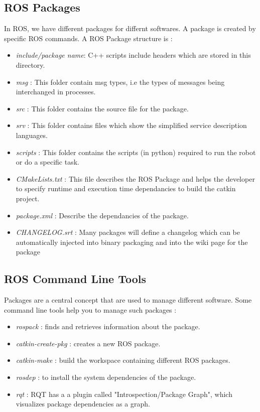 \subsection{ROS Packages}
In ROS, we have different packages for differnt softwares. A package is created by specific ROS commands. A ROS Package structure is : 
\begin{itemize}
    \item \textit{include/package name}: C++ scripts include headers which are stored in this directory.
    \item \textit{msg} : This folder contain msg types, i.e the types of messages being interchanged in processes.
    \item \textit{src} : This folder contains the source file for the package.
    \item \textit{srv} : This folder contains files which show the simplified service description languages.
    \item \textit{scripts} : This folder contains the scripts (in python) required to run the robot or do a specific task.
    \item \textit{CMakeLists.txt} : This file describes the ROS Package and helps the developer to specify runtime and execution time dependancies to build the catkin project.
    \item \textit{package.xml} : Describe the dependancies of the package.
    \item \textit{CHANGELOG.srt} : Many packages will define a changelog which can be automatically injected into binary packaging and into the wiki page for the package
\end{itemize}

\subsection{ROS Command Line Tools}
Packages are a central concept that are used to manage different software. Some command line tools help you to manage such packages : 
\begin{itemize}
    \item \textit{rospack} : finds and retrieves information about the package.
    \item \textit{catkin-create-pkg} : creates a new ROS package. 
    \item \textit{catkin-make} : build the workspace containing different ROS packages.
    \item \textit{rosdep} : to install the system dependencies of the package.
    \item \textit{rqt} : RQT has a  a plugin called "Introspection/Package Graph", which visualizes package dependencies as a graph.
\end{itemize} 

